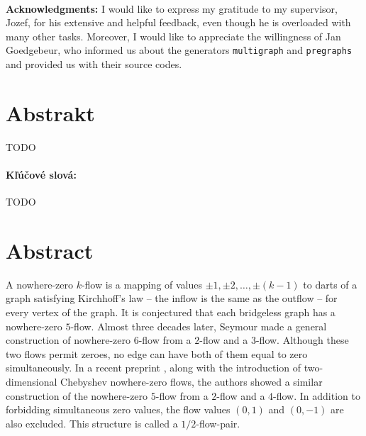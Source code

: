 \documentclass[12pt, oneside]{book}  %
\theoremstyle{definition}
\theoremstyle{definition}
\theoremstyle{remark}
\begin{document}
\newpage
\setcounter{page}{3}





\newpage
\pagestyle{plain}
~

\vfill
{\bf Acknowledgments:} I would like to express my gratitude to my supervisor, Jozef, for his extensive and helpful feedback, even though he is overloaded with many other tasks. Moreover, I would like to appreciate the willingness of Jan Goedgebeur, who informed us about the generators \texttt{multigraph} and \texttt{pregraphs} and provided us with their source codes.


\newpage
\section*{Abstrakt}

TODO


\paragraph*{Kľúčové slová:} TODO


\newpage
\section*{Abstract}

A nowhere-zero $k$-flow is a mapping of values $\pm 1, \pm 2, \dots, \pm(k-1)$ to darts of a graph satisfying Kirchhoff's law – the inflow is the same as the outflow – for every vertex of the graph. It is conjectured \cite{tutte} that each bridgeless graph has a nowhere-zero $5$-flow. Almost three decades later, Seymour \cite{seymour} made a general construction of nowhere-zero $6$-flow from a $2$-flow and a $3$-flow. Although these two flows permit zeroes, no edge can have both of them equal to zero simultaneously. In a recent preprint \cite{preprint}, along with the introduction of two-dimensional Chebyshev nowhere-zero flows, the authors showed a similar construction of the nowhere-zero $5$-flow from a $2$-flow and a $4$-flow. In addition to forbidding simultaneous zero values, the flow values $(0,1)$ and $(0,-1)$ are also excluded. This structure is called a $1/2$-flow-pair.
\end{document}
